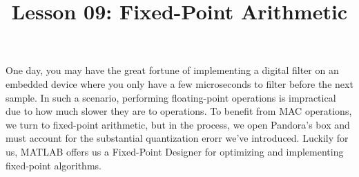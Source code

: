 \documentclass{article}
\title{Lesson 09: Fixed-Point Arithmetic}
\begin{document}
\renderTitle

One day, you may have the great fortune of implementing a digital filter
on an embedded device where you only have a few microseconds to filter
before the next sample.  In such a scenario, performing floating-point
operations is impractical due to how much slower they are to  operations.  To benefit from MAC operations,
we turn to fixed-point arithmetic, but in the process, we open Pandora's
box and must account for the substantial quantization erorr we've
introduced.  Luckily for us, MATLAB offers us a Fixed-Point Designer%
 for
optimizing and implementing fixed-point algorithms.
\end{document}
